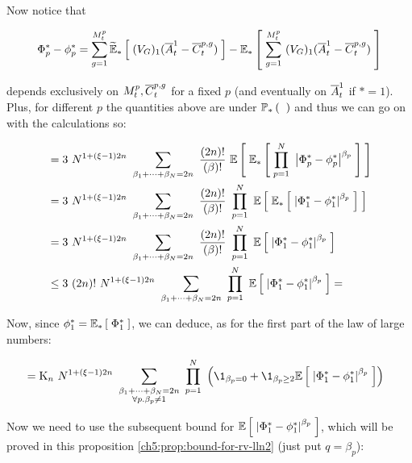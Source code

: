 	Now notice that 
	
	\begin{equation*}
		\Phi_p^\ast - \phi_p^\ast
		= 
		\sum _{g = 1}^{M_t^p} 
		\widetilde{\mathbb{E}}_{\ast} \left[ \; 
			(V_{G})_1(\overline{A}_t^1 - \overline{C}_t^{p,g})
		 \; \right]
		-
		\mathbb{E}_{\ast} \left[ \; 
			\sum _{g = 1}^{M_t^p}\
			(V_{G})_1(\overline{A}_t^1 - \overline{C}_t^{p,g})
		 \; \right]
	\end{equation*}
	
	depends exclusively on $M_t^p, \overline{C}_t^{p,g}$ for a fixed $p$ (and eventually on $\overline{A}_t^1$ if $\ast = 1$).
	Plus, for different $p$ the quantities above are \iid under $\mathbb{P}_{\ast} \left( \;  \; \right)$ and thus we can go on with the calculations so:
	
	\begin{align*}
		&=		
		3\
		N^{1 +(\xi-1) 2n}\
		\sum_{\beta_1 + \cdots + \beta_N =2n}\
		\frac{(2n)!}{(\beta)!}\
		\mathbb{E} \left[ \; 
			\mathbb{E}_{\ast} \left[ \; 
				\prod_{p=1}^N\
				\left| 
					\Phi_p^\ast - \phi_p^\ast
				 \right|^{\beta_p}
			 \; \right]
		 \; \right]
		\\
		&=
		3\
		N^{1 +(\xi-1) 2n}\
		\sum_{\beta_1 + \cdots + \beta_N =2n}\
		\frac{(2n)!}{(\beta)!}\
		\prod_{p=1}^N\
		\mathbb{E} \left[ \; 
			\mathbb{E}_{\ast} \left[ \; 
				\left| 
					\Phi_1^\ast - \phi_1^\ast
				 \right|^{\beta_p}
			 \; \right]
		 \; \right]
		\\
		&=
		3\
		N^{1 +(\xi-1) 2n}\
		\sum_{\beta_1 + \cdots + \beta_N =2n}\
		\frac{(2n)!}{(\beta)!}\
		\prod_{p=1}^N\
		\mathbb{E} \left[ \; 
			\left| 
				\Phi_1^\ast - \phi_1^\ast
			 \right|^{\beta_p}
		 \; \right]
		\\
		&\leq
		3\
		(2n)!\
		N^{1 +(\xi-1) 2n}\
		\sum_{\beta_1 + \cdots + \beta_N =2n}\
		\prod_{p=1}^N\
		\mathbb{E} \left[ \; 
			\left| 
				\Phi_1^\ast - \phi_1^\ast
			 \right|^{\beta_p}
		 \; \right]
		=
	\end{align*}
	
	Now, since $\phi_1^\ast = \mathbb{E}_{\ast} \left[ \; \Phi_1^\ast \; \right]$, we can deduce, as for the first part of the law of large numbers:
	
	\begin{align*}
		&=
		\const_n\
		N^{1 +(\xi-1) 2n}\
		\sum_{
			\substack{
				\beta_1 + \cdots + \beta_N =2n
				\\
				\forall p. \beta_p \neq 1
			}
		}\
		\prod_{p=1}^N\
		\left(
		\1_{\beta_p=0}
		+
		\1_{\beta_p \geq 2}
		\E{
			\norm{
				\Phi_1^\ast - \phi_1^\ast
			}^{\beta_p}
		}
		\right)
	\end{align*}
	
	Now we need to use the subsequent bound for $\mathbb{E} \left[ \; 
		\left| 
			\Phi_1^\ast - \phi_1^\ast
		 \right|^{\beta_p}
	 \; \right]$, which will be proved in this proposition \ref{ch5:prop:bound-for-rv-lln2} (just put $q = \beta_p$):
	
